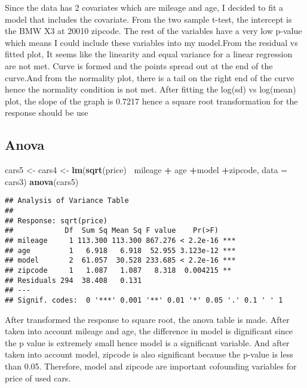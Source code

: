 \documentclass[]{article}
\newenvironment{Shaded}{\begin{snugshade}}{\end{snugshade}}
\newcommand{\DataTypeTok}[1]{\textcolor[rgb]{0.13,0.29,0.53}{#1}}
\newcommand{\KeywordTok}[1]{\textcolor[rgb]{0.13,0.29,0.53}{\textbf{#1}}}
\newcommand{\NormalTok}[1]{#1}
\newcommand{\OperatorTok}[1]{\textcolor[rgb]{0.81,0.36,0.00}{\textbf{#1}}}
\newcommand{\StringTok}[1]{\textcolor[rgb]{0.31,0.60,0.02}{#1}}
\begin{document}
Since the data has 2 covariates which are mileage and age, I decided to
fit a model that includes the covariate. From the two sample t-test, the
intercept is the BMW X3 at 20010 zipcode. The rest of the variables have
a very low p-value which means I could include these variables into my
model.From the residual vs fitted plot, It seems like the linearity and
equal variance for a linear regression are not met. Curve is formed and
the points spread out at the end of the curve.And from the normality
plot, there is a tail on the right end of the curve hence the normality
condition is not met. After fitting the log(sd) vs log(mean) plot, the
slope of the graph is 0.7217 hence a square root transformation for the
response should be use

\hypertarget{anova}{%
\subsection{Anova}\label{anova}}

\begin{Shaded}
\begin{Highlighting}[]
\NormalTok{cars5 <-}\StringTok{ }\NormalTok{cars4 <-}\StringTok{ }\KeywordTok{lm}\NormalTok{(}\KeywordTok{sqrt}\NormalTok{(price)}\OperatorTok{~}\StringTok{ }\NormalTok{mileage }\OperatorTok{+}\StringTok{ }\NormalTok{age }\OperatorTok{+}\NormalTok{model }\OperatorTok{+}\NormalTok{zipcode, }\DataTypeTok{data =}\NormalTok{ cars3)}
\KeywordTok{anova}\NormalTok{(cars5)}
\end{Highlighting}
\end{Shaded}

\begin{verbatim}
## Analysis of Variance Table
## 
## Response: sqrt(price)
##            Df  Sum Sq Mean Sq F value    Pr(>F)    
## mileage     1 113.300 113.300 867.276 < 2.2e-16 ***
## age         1   6.918   6.918  52.955 3.123e-12 ***
## model       2  61.057  30.528 233.685 < 2.2e-16 ***
## zipcode     1   1.087   1.087   8.318  0.004215 ** 
## Residuals 294  38.408   0.131                      
## ---
## Signif. codes:  0 '***' 0.001 '**' 0.01 '*' 0.05 '.' 0.1 ' ' 1
\end{verbatim}

After transformed the response to square root, the anova table is made.
After taken into account mileage and age, the difference in model is
dignificant since the p value is extremely small hence model is a
significant variable. And after taken into account model, zipcode is
also significant because the p-value is less than 0.05. Therefore, model
and zipcode are important cofounding variables for price of used cars.
\end{document}
